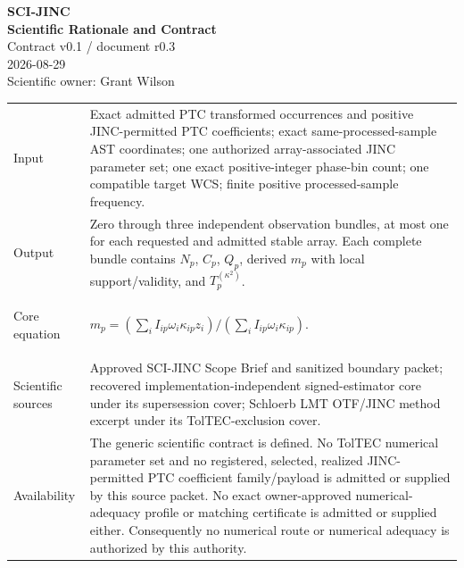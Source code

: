 \documentclass[11pt]{article}
\newcommand{\ContractVersion}{v0.1}
\newcommand{\DocumentRevision}{r0.3}
\newcommand{\DocumentDate}{2026-08-29}
\begin{document}
\begin{center}
  {\Large\bfseries\textcolor{JincBlue}{SCI-JINC}}\\[0.35em]
  {\LARGE\bfseries Scientific Rationale and Contract}\\[0.65em]
  {\large Contract \ContractVersion{} / document \DocumentRevision{}}\\[0.25em]
  {\large \DocumentDate}\\[0.25em]
  {\large Scientific owner: Grant Wilson}
\end{center}

\vspace{0.5em}
\noindent{}

\vspace{0.8em}
\renewcommand{\arraystretch}{1.18}
\begin{tabularx}{\textwidth}{@{}>{\bfseries\raggedright\arraybackslash}p{}X@{}}
\toprule
Input & Exact admitted PTC transformed occurrences and positive
JINC-permitted PTC coefficients; exact same-processed-sample AST coordinates;
one authorized array-associated JINC parameter set; one exact positive-integer
phase-bin count; one compatible target WCS; finite positive processed-sample
frequency. \\
Output & Zero through three independent observation bundles, at most one for
each requested and admitted stable array.  Each complete bundle contains
$N_p$, $C_p$, $Q_p$, derived $m_p$ with local support/validity, and
$T_p^{(\kappa^2)}$. \\
Core equation & $m_p=\left(\sum_i I_{ip}\omega_i\kappa_{ip}z_i\right)
/\left(\sum_i I_{ip}\omega_i\kappa_{ip}\right)$. \\
Scientific sources & Approved SCI-JINC Scope Brief and sanitized boundary
packet; recovered implementation-independent signed-estimator core under its
supersession cover; Schloerb LMT OTF/JINC method excerpt under its
TolTEC-exclusion cover. \\
Availability & The generic scientific contract is defined.  No TolTEC
numerical parameter set and no registered, selected, realized JINC-permitted
PTC coefficient family/payload is admitted or supplied by this source packet.
No exact owner-approved numerical-adequacy profile or matching certificate is
admitted or supplied either.  Consequently no numerical route or numerical
adequacy is authorized by this authority. \\
\bottomrule
\end{tabularx}
\end{document}
